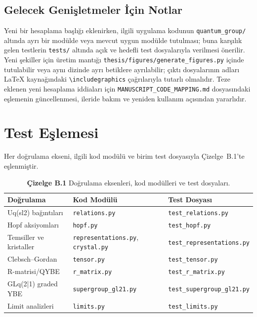 \documentclass[12pt,a4paper]{report}
\numberwithin{equation}{chapter}
\theoremstyle{plain}
\theoremstyle{definition}
\begin{document}
\section{Gelecek Genişletmeler İçin Notlar}

Yeni bir hesaplama başlığı eklenirken, ilgili uygulama kodunun
\texttt{quantum\_group/} altında ayrı bir modülde veya mevcut uygun modülde
tutulması; buna karşılık gelen testlerin \texttt{tests/} altında açık ve hedefli
test dosyalarıyla verilmesi önerilir. Yeni şekiller için üretim mantığı
\texttt{thesis/figures/generate\_figures.py} içinde tutulabilir veya aynı dizinde
ayrı betiklere ayrılabilir; çıktı dosyalarının adları LaTeX kaynağındaki
\texttt{\textbackslash includegraphics} çağrılarıyla tutarlı olmalıdır. Teze
eklenen yeni hesaplama iddiaları için \texttt{MANUSCRIPT\_CODE\_MAPPING.md}
dosyasındaki eşlemenin güncellenmesi, ileride bakım ve yeniden kullanım
açısından yararlıdır.

\chapter{Test Eşlemesi}

Her doğrulama ekseni, ilgili kod modülü ve birim test dosyasıyla
Çizelge~B.1'te eşlenmiştir.

\begin{table}[H]
\centering
\footnotesize
\caption{\textbf{Çizelge B.1} Doğrulama eksenleri, kod modülleri ve test dosyaları.}
\label{tab:tests}
\begin{tabularx}{\textwidth}{@{}>{\raggedright\arraybackslash}p{}X>{\raggedright\arraybackslash}p{}@{}}
\toprule
Doğrulama & Kod Modülü & Test Dosyası \\
\midrule
Uq(sl2) bağıntıları & \texttt{relations.py} & \texttt{test\_relations.py} \\
Hopf aksiyomları & \texttt{hopf.py} & \texttt{test\_hopf.py} \\
Temsiller ve kristaller & \texttt{representations.py}, \texttt{crystal.py} & \texttt{test\_representations.py} \\
Clebsch--Gordan & \texttt{tensor.py} & \texttt{test\_tensor.py} \\
R-matrisi/QYBE & \texttt{r\_matrix.py} & \texttt{test\_r\_matrix.py} \\
GLq(2|1) graded YBE & \texttt{supergroup\_gl21.py} & \texttt{test\_supergroup\_gl21.py} \\
Limit analizleri & \texttt{limits.py} & \texttt{test\_limits.py} \\
\bottomrule
\end{tabularx}
\end{table}
\end{document}
